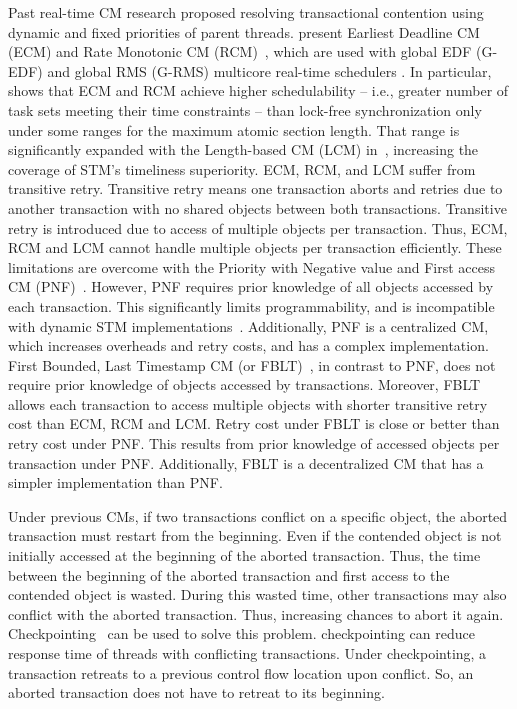 \documentclass[conference]{IEEEtran}
\begin{document}
Past real-time CM research proposed resolving transactional contention using dynamic and fixed priorities of parent threads. \cite{6045438,stmconcurrencycontrol:emsoft11,lcmdac2012} present  Earliest Deadline CM (ECM) and Rate Monotonic CM (RCM)~, which are used with global EDF (G-EDF) and global RMS (G-RMS) multicore real-time schedulers \cite{Davis:2011:SHR:1978802.1978814}.
In particular,~\cite{stmconcurrencycontrol:emsoft11} shows that ECM and RCM achieve higher schedulability -- i.e., greater number of task sets meeting their time constraints -- than lock-free synchronization only under some ranges for the maximum atomic section length. That range is significantly expanded with the Length-based CM (LCM) in~\cite{lcmdac2012}, increasing the coverage of STM's timeliness superiority. ECM, RCM, and LCM suffer from transitive retry. Transitive retry means one transaction aborts and retries due to another transaction with no shared objects between both transactions. Transitive retry is introduced due to access of multiple objects per transaction. Thus, ECM, RCM and LCM cannot handle multiple objects per transaction efficiently. These limitations are overcome with the Priority with Negative value and First access CM (PNF)~\cite{pnf_dac_asp}. However, PNF requires prior knowledge of all objects accessed by each transaction. This significantly limits programmability, and is incompatible with dynamic STM implementations~\cite{Herlihy:2003:STM:872035.872048}. Additionally, PNF is a centralized CM, which increases overheads and retry costs, and has a complex implementation. First Bounded, Last Timestamp CM (or FBLT)~\cite{fblt}, in contrast to PNF, does not require prior knowledge of objects accessed by transactions. Moreover, FBLT allows each transaction to access multiple objects with shorter transitive retry cost than ECM, RCM and LCM. Retry cost under FBLT is close or better than retry cost under PNF. This results from prior knowledge of accessed objects per transaction under PNF. Additionally, FBLT is a decentralized CM that has a simpler implementation than PNF.

Under previous CMs, if two transactions conflict on a specific object, the aborted transaction must restart from the beginning. Even if the contended object is not initially accessed at the beginning of the aborted transaction. Thus, the time between the beginning of the aborted transaction and first access to the contended object is wasted. During this wasted time, other transactions may also conflict with the aborted transaction. Thus, increasing chances to abort it again. Checkpointing~\cite{Koskinen:2008:CCI:1378533.1378563} can be used to solve this problem. checkpointing can reduce response time of threads with conflicting transactions. Under checkpointing, a transaction retreats to a previous control flow location upon conflict. So, an aborted transaction does not have to retreat to its beginning.
\end{document}
